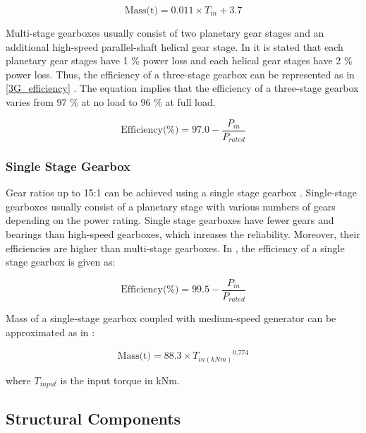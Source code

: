 \documentclass{article}\usepackage{graphicx, color}
\begin{document}
\begin{equation}
\text{Mass(t)} = 0.011 \times T_{in} + 3.7
\label{3G_gearbox}
\end{equation}


Multi-stage gearboxes usually consist of two planetary gear stages and an additional high-speed parallel-shaft helical gear stage. In \cite{Hau2005a} it is stated that each planetary gear stages have 1 \% power loss and each helical gear stages have 2 \% power loss. Thus, the efficiency of a three-stage gearbox can be represented as in \autoref{3G_efficiency} \cite{Zhang2011a}. The equation implies that the efficiency of a three-stage gearbox varies from 97 \% at no load to 96 \% at full load.

\begin{equation}
  \text{Efficiency(\%)} = 97.0 - \dfrac{P_{in}}{P_{rated}}
  \label{3G_efficiency}
\end{equation}

\subsubsection{Single Stage Gearbox}

Gear ratios up to 15:1 can be achieved using a single stage gearbox \cite{Cotrell2002}. Single-stage gearboxes usually consist of a planetary stage with various numbers of gears depending on the power rating. Single stage gearboxes have fewer gears and bearings than high-speed gearboxes, which inreases the reliability. Moreover, their efficiencies are higher than multi-stage gearboxes. In \cite{Matveev2011}, the efficiency of a single stage gearbox is given as:

\begin{equation}
  \text{Efficiency(\%)} = 99.5 - \dfrac{P_{in}}{P_{rated}}
\end{equation}

Mass of a single-stage gearbox coupled with medium-speed generator can be approximated as in \cite{Fingersh2006}:

\begin{equation}
	\text{Mass(t)} = 88.3 \times {T_{in(kNm)}}^{0.774}
\end{equation}

where $T_{input}$ is the input torque in kNm.


\subsection{Structural Components}
\end{document}
